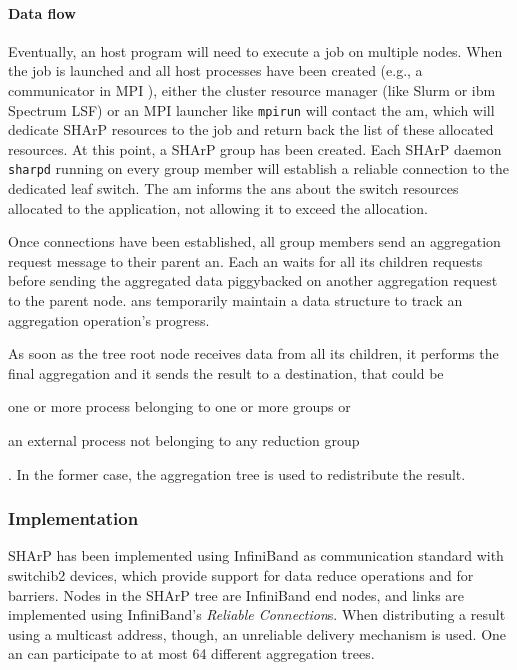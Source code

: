 \paragraph{Data flow}
Eventually, an host program will need to execute a job on multiple nodes.
When the job is launched and all host processes have been created (e.g., a communicator in MPI \cite{mpi}), either the cluster resource manager (like Slurm \cite{slurm} or \glsdesc{ibm} Spectrum LSF) or an MPI \cite{mpi} launcher like \texttt{mpirun} will contact the \gls{am}, which will dedicate SHArP \cite{sharp} resources to the job and return back the list of these allocated resources.
At this point, a SHArP \cite{sharp} group has been created.
Each SHArP \cite{sharp} daemon \texttt{sharpd} running on every group member will establish a reliable connection to the dedicated leaf switch.
The \gls{am} informs the \glspl{an} about the switch resources allocated to the application, not allowing it to exceed the allocation.\par
Once connections have been established, all group members send an aggregation request message to their parent \gls{an}.
Each \gls{an} waits for all its children requests before sending the aggregated data piggybacked on another aggregation request to the parent node.
\glspl{an} temporarily maintain a data structure to track an aggregation operation's progress.\par
As soon as the tree root node receives data from all its children, it performs the final aggregation and it sends the result to a destination, that could be
\begin{mylist}
    \item one or more process belonging to one or more groups or
    \item an external process not belonging to any reduction group
\end{mylist}.
In the former case, the aggregation tree is used to redistribute the result.

\subsubsection{Implementation}
SHArP \cite{sharp} has been implemented using InfiniBand \cite{infiniband} as communication standard with \glsdesc{switchib2} devices, which provide support for data reduce operations and for barriers.
Nodes in the SHArP \cite{sharp} tree are InfiniBand \cite{infiniband} end nodes, and links are implemented using InfiniBand's \cite{infiniband} \textit{Reliable Connection}s.
When distributing a result using a multicast address, though, an unreliable delivery mechanism is used.
One \gls{an} can participate to at most 64 different aggregation trees.

